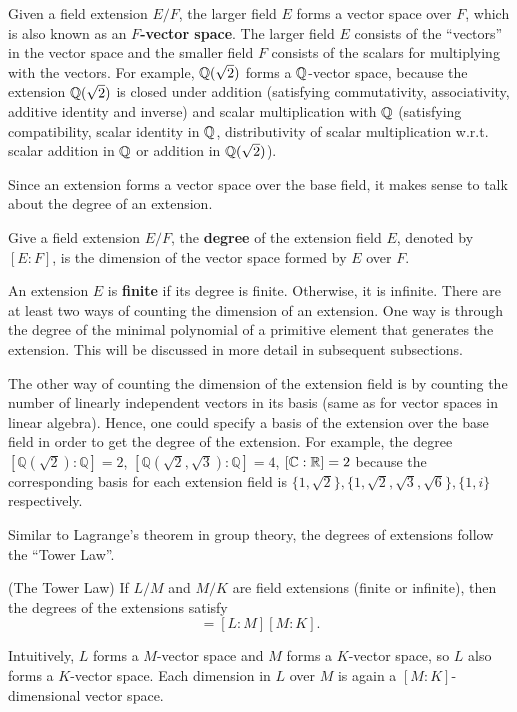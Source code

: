 \documentclass[../main.tex]{subfiles}
\begin{document}
\reversemarginpar
{}
Given a field extension $E/F$, the larger field $E$ forms a vector space over $F$, which is also known as an \textbf{$F$-vector space}. The larger field $E$ consists of the ``vectors'' in the vector space and the smaller field $F$ consists of the scalars for multiplying with the vectors. For example, $\mathbb{Q}(\sqrt{2})$ forms a $\mathbb{Q}$-vector space, because the extension $\mathbb{Q}(\sqrt{2})$ is closed under addition (satisfying commutativity, associativity, additive identity and inverse) and scalar multiplication with $\mathbb{Q}$ (satisfying compatibility, scalar identity in $\mathbb{Q}$, distributivity of scalar multiplication w.r.t. scalar addition in $\mathbb{Q}$ or addition in $\mathbb{Q}(\sqrt{2})$). 

\reversemarginpar
{}
Since an extension forms a vector space over the base field, it makes sense to talk about the degree of an extension. 
\begin{definition}
Give a field extension $E/F$, the \textbf{degree} of the extension field $E$, denoted by $[E:F]$, is the dimension of the vector space formed by $E$ over $F$.
\end{definition}
An extension $E$ is \textbf{finite} if its degree is finite. Otherwise, it is infinite. 
There are at least two ways of counting the dimension of an extension. One way is through the degree of the minimal polynomial of a primitive element that generates the extension. This will be discussed in more detail in subsequent subsections. 


The other way of counting the dimension of the extension field is by counting the number of linearly independent vectors in its basis (same as for vector spaces in linear algebra). Hence, one could specify a basis of the extension over the base field in order to get the degree of the extension. For example, the degree $[\mathbb{Q}(\sqrt{2}):\mathbb{Q}]=2$,  $[\mathbb{Q}(\sqrt{2},\sqrt{3}):\mathbb{Q}]=4$, $[\mathbb{C}:\mathbb{R}]=2$ because the corresponding basis for each  extension field is $\{1, \sqrt{2}\}, \{1, \sqrt{2},\sqrt{3},\sqrt{6}\}, \{1,i\}$ respectively.

Similar to Lagrange's theorem in group theory, the degrees of extensions follow the ``Tower Law''. 
\begin{proposition} (The Tower Law)
\label{prop:tower law}
If $L/M$ and $M/K$ are field extensions (finite or infinite), then the degrees of the extensions satisfy 
\begin{equation*}
    [L:K] = [L:M][M:K].
\end{equation*}
\end{proposition}
Intuitively, $L$ forms a $M$-vector space and $M$ forms a $K$-vector space, so $L$ also forms a $K$-vector space. Each dimension in $L$ over $M$ is again a $[M:K]$-dimensional vector space.  
\end{document}
